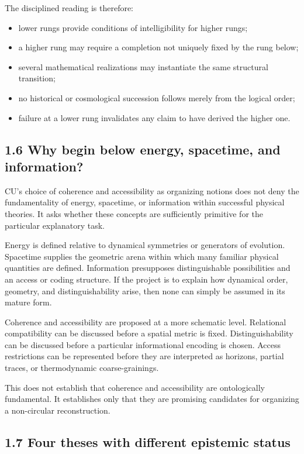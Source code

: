 \documentclass[
  11pt,
]{article}
\providecommand{\tightlist}{%
  \setlength{\itemsep}{0pt}\setlength{\parskip}{0pt}}
\begin{document}
The disciplined reading is therefore:

\begin{itemize}
\tightlist
\item
  lower rungs provide conditions of intelligibility for higher rungs;
\item
  a higher rung may require a completion not uniquely fixed by the rung
  below;
\item
  several mathematical realizations may instantiate the same structural
  transition;
\item
  no historical or cosmological succession follows merely from the
  logical order;
\item
  failure at a lower rung invalidates any claim to have derived the
  higher one.
\end{itemize}

\subsection{1.6 Why begin below energy, spacetime, and
information?}\label{why-begin-below-energy-spacetime-and-information}

CU's choice of coherence and accessibility as organizing notions does
not deny the fundamentality of energy, spacetime, or information within
successful physical theories. It asks whether these concepts are
sufficiently primitive for the particular explanatory task.

Energy is defined relative to dynamical symmetries or generators of
evolution. Spacetime supplies the geometric arena within which many
familiar physical quantities are defined. Information presupposes
distinguishable possibilities and an access or coding structure. If the
project is to explain how dynamical order, geometry, and
distinguishability arise, then none can simply be assumed in its mature
form.

Coherence and accessibility are proposed at a more schematic level.
Relational compatibility can be discussed before a spatial metric is
fixed. Distinguishability can be discussed before a particular
informational encoding is chosen. Access restrictions can be represented
before they are interpreted as horizons, partial traces, or
thermodynamic coarse-grainings.

This does not establish that coherence and accessibility are
ontologically fundamental. It establishes only that they are promising
candidates for organizing a non-circular reconstruction.

\subsection{1.7 Four theses with different epistemic
status}\label{four-theses-with-different-epistemic-status}
\end{document}
